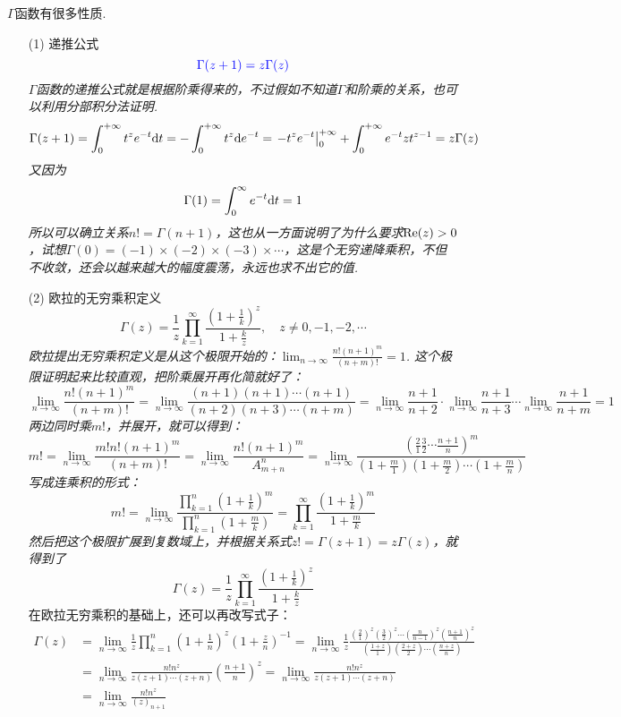 \documentclass[UTF8]{ctexart}
\newcommand{\trm}[1]{{\rm #1}}
\begin{document}
\(\Gamma\)函数有很多性质.
\begin{itemize}

    \item [(1)] 递推公式
    \[ {\color{blue} \Gamma(z+1) = z\Gamma(z)} \]
    \textit{
        \(\Gamma\)函数的递推公式就是根据阶乘得来的，不过假如不知道\(\Gamma\)和阶乘的关系，也可以利用分部积分法证明.
        \[ \Gamma(z+1) = \int_0^{+\infty} t^{z} e^{-t} \trm{d}t = -\int_{0}^{+\infty}t^z \trm{d}e^{-t} = \left.-t^ze^{-t}\right|_0^{+\infty}+\int_{0}^{+\infty}e^{-t}zt^{z-1} = z\Gamma(z)\]
        又因为
        \[ \Gamma(1) = \int_{0}^{\infty} e^{-t}\trm{d}t = 1\]
        所以可以确立关系\(n! = \Gamma(n+1)\)，这也从一方面说明了为什么要求\(\trm{Re}(z)>0\)，试想\(\Gamma(0) = (-1)\times(-2)\times(-3)\times\cdots\)，这是个无穷递降乘积，不但不收敛，还会以越来越大的幅度震荡，永远也求不出它的值.
    }

    \item[(2)] 欧拉的无穷乘积定义
    \[\Gamma(z) = \frac{1}{z}\prod_{k=1}^{\infty} \frac{(1+\frac{1}{k})^z}{1+\frac{k}{z}}, \quad z \neq 0, -1, -2, \cdots\]
    \textit{
        欧拉提出无穷乘积定义是从这个极限开始的：\(\displaystyle{\lim_{n \to \infty} \frac{n!(n+1)^m}{(n+m)!}}=1\). 这个极限证明起来比较直观，把阶乘展开再化简就好了：
        \[\lim_{n \to \infty} \frac{n!(n+1)^m}{(n+m)!} = \lim_{n \to \infty} \frac{(n+1)(n+1) \cdots (n+1)}{(n+2)(n+3)\cdots(n+m)} = \lim_{n \to \infty} \frac{n+1}{n+2} \cdot \lim_{n \to \infty} \frac{n+1}{n+3} \cdots \lim_{n \to \infty} \frac{n+1}{n+m} = 1\]
        两边同时乘\(m!\)，并展开，就可以得到：
        \[m! = \lim_{n \to \infty} \frac{m!n!(n+1)^m}{(n+m)!} = \lim_{n \to \infty} \frac{n!(n+1)^m}{A_{m+n}^n} = \lim_{n \to \infty} \frac{\left( \frac{2}{1}\frac{3}{2}\cdots\frac{n+1}{n}\right)^m}{(1+\frac{m}{1})(1+\frac{m}{2})\cdots(1+\frac{m}{n})}\]
        写成连乘积的形式：
        \[ m! = \lim_{n \to \infty} \frac{\prod_{k=1}^{n}\left(1+\frac{1}{k}\right)^m}{\prod_{k=1}^{n}(1+\frac{m}{k})} = \prod_{k=1}^{\infty}\frac{(1+\frac{1}{k})^m}{1+\frac{m}{k}}\]
        然后把这个极限扩展到复数域上，并根据关系式\(z!=\Gamma(z+1) = z\Gamma(z)\)，就得到了
        \[\Gamma(z) = \frac{1}{z}\prod_{k=1}^{\infty} \frac{(1+\frac{1}{k})^z}{1+\frac{k}{z}}\]
    }
    在欧拉无穷乘积的基础上，还可以再改写式子：
    \begin{align*}
        \Gamma(z) &= \lim_{n \to \infty}\frac{1}{z}\prod_{k=1}^{n}\left(1+\frac{1}{n}\right)^z\left(1+\frac{z}{n}\right)^{-1} = \lim_{n \to \infty} \frac{1}{z} \frac{(\frac{2}{1})^z(\frac{3}{2})^z\cdots(\frac{n}{n-1})^z(\frac{n+1}{n})^z}{(\frac{1+z}{1})(\frac{2+z}{2})\cdots(\frac{n+z}{n})} \\
        &= \lim_{n \to \infty}\frac{n!n^z}{z(z+1)\cdots(z+n)}\left(\frac{n+1}{n}\right)^z = \lim_{n \to \infty} \frac{n!n^z}{z(z+1)\cdots(z+n)} \\
        &= \lim_{n \to \infty} \frac{n!n^z}{(z)_{n+1}}
    \end{align*}
     

\end{itemize}
\end{document}
